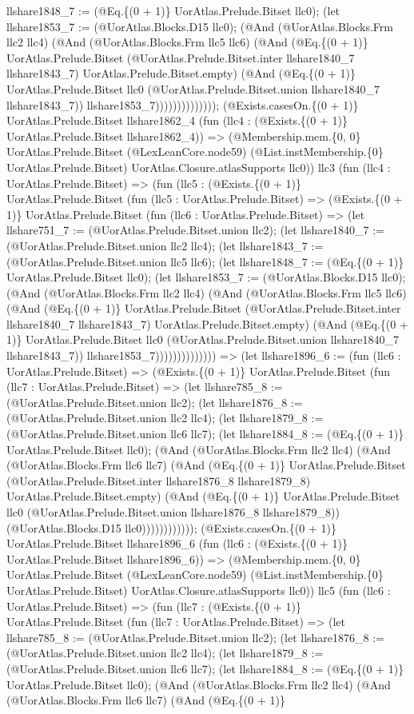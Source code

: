 \documentclass[11pt]{article}
\begin{document}
llshare1848\_7 := (@Eq.\{(0 + 1)\} UorAtlas.Prelude.Bitset llc0); (let llshare1853\_7 := (@UorAtlas.Blocks.D15 llc0); (@And (@UorAtlas.Blocks.Frm llc2 llc4) (@And (@UorAtlas.Blocks.Frm llc5 llc6) (@And (@Eq.\{(0 + 1)\} UorAtlas.Prelude.Bitset (@UorAtlas.Prelude.Bitset.inter llshare1840\_7 llshare1843\_7) UorAtlas.Prelude.Bitset.empty) (@And (@Eq.\{(0 + 1)\} UorAtlas.Prelude.Bitset llc0 (@UorAtlas.Prelude.Bitset.union llshare1840\_7 llshare1843\_7)) llshare1853\_7)))))))))))))); (@Exists.casesOn.\{(0 + 1)\} UorAtlas.Prelude.Bitset llshare1862\_4 (fun (llc4 : (@Exists.\{(0 + 1)\} UorAtlas.Prelude.Bitset llshare1862\_4)) => (@Membership.mem.\{0, 0\} UorAtlas.Prelude.Bitset (@LexLeanCore.node59) (@List.instMembership.\{0\} UorAtlas.Prelude.Bitset) UorAtlas.Closure.atlasSupports llc0)) llc3 (fun (llc4 : UorAtlas.Prelude.Bitset) => (fun (llc5 : (@Exists.\{(0 + 1)\} UorAtlas.Prelude.Bitset (fun (llc5 : UorAtlas.Prelude.Bitset) => (@Exists.\{(0 + 1)\} UorAtlas.Prelude.Bitset (fun (llc6 : UorAtlas.Prelude.Bitset) => (let llshare751\_7 := (@UorAtlas.Prelude.Bitset.union llc2); (let llshare1840\_7 := (@UorAtlas.Prelude.Bitset.union llc2 llc4); (let llshare1843\_7 := (@UorAtlas.Prelude.Bitset.union llc5 llc6); (let llshare1848\_7 := (@Eq.\{(0 + 1)\} UorAtlas.Prelude.Bitset llc0); (let llshare1853\_7 := (@UorAtlas.Blocks.D15 llc0); (@And (@UorAtlas.Blocks.Frm llc2 llc4) (@And (@UorAtlas.Blocks.Frm llc5 llc6) (@And (@Eq.\{(0 + 1)\} UorAtlas.Prelude.Bitset (@UorAtlas.Prelude.Bitset.inter llshare1840\_7 llshare1843\_7) UorAtlas.Prelude.Bitset.empty) (@And (@Eq.\{(0 + 1)\} UorAtlas.Prelude.Bitset llc0 (@UorAtlas.Prelude.Bitset.union llshare1840\_7 llshare1843\_7)) llshare1853\_7)))))))))))))) => (let llshare1896\_6 := (fun (llc6 : UorAtlas.Prelude.Bitset) => (@Exists.\{(0 + 1)\} UorAtlas.Prelude.Bitset (fun (llc7 : UorAtlas.Prelude.Bitset) => (let llshare785\_8 := (@UorAtlas.Prelude.Bitset.union llc2); (let llshare1876\_8 := (@UorAtlas.Prelude.Bitset.union llc2 llc4); (let llshare1879\_8 := (@UorAtlas.Prelude.Bitset.union llc6 llc7); (let llshare1884\_8 := (@Eq.\{(0 + 1)\} UorAtlas.Prelude.Bitset llc0); (@And (@UorAtlas.Blocks.Frm llc2 llc4) (@And (@UorAtlas.Blocks.Frm llc6 llc7) (@And (@Eq.\{(0 + 1)\} UorAtlas.Prelude.Bitset (@UorAtlas.Prelude.Bitset.inter llshare1876\_8 llshare1879\_8) UorAtlas.Prelude.Bitset.empty) (@And (@Eq.\{(0 + 1)\} UorAtlas.Prelude.Bitset llc0 (@UorAtlas.Prelude.Bitset.union llshare1876\_8 llshare1879\_8)) (@UorAtlas.Blocks.D15 llc0)))))))))))); (@Exists.casesOn.\{(0 + 1)\} UorAtlas.Prelude.Bitset llshare1896\_6 (fun (llc6 : (@Exists.\{(0 + 1)\} UorAtlas.Prelude.Bitset llshare1896\_6)) => (@Membership.mem.\{0, 0\} UorAtlas.Prelude.Bitset (@LexLeanCore.node59) (@List.instMembership.\{0\} UorAtlas.Prelude.Bitset) UorAtlas.Closure.atlasSupports llc0)) llc5 (fun (llc6 : UorAtlas.Prelude.Bitset) => (fun (llc7 : (@Exists.\{(0 + 1)\} UorAtlas.Prelude.Bitset (fun (llc7 : UorAtlas.Prelude.Bitset) => (let llshare785\_8 := (@UorAtlas.Prelude.Bitset.union llc2); (let llshare1876\_8 := (@UorAtlas.Prelude.Bitset.union llc2 llc4); (let llshare1879\_8 := (@UorAtlas.Prelude.Bitset.union llc6 llc7); (let llshare1884\_8 := (@Eq.\{(0 + 1)\} UorAtlas.Prelude.Bitset llc0); (@And (@UorAtlas.Blocks.Frm llc2 llc4) (@And (@UorAtlas.Blocks.Frm llc6 llc7) (@And (@Eq.\{(0 + 1)\} 
\end{document}
